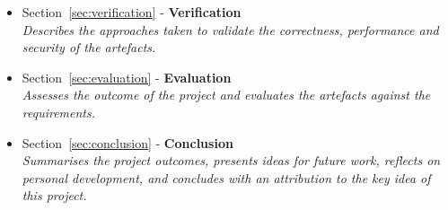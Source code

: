 \begin{itemize}
	\item Section~\ref{sec:verification} - \textbf{Verification} \\ \textit{Describes the approaches taken to validate the correctness, performance and security of the artefacts.}
	\item Section~\ref{sec:evaluation} - \textbf{Evaluation} \\ \textit{Assesses the outcome of the project and evaluates the artefacts against the requirements.}
	\item Section~\ref{sec:conclusion} - \textbf{Conclusion} \\ \textit{Summarises the project outcomes, presents ideas for future work, reflects on personal development, and concludes with an attribution to the key idea of this project.}
\end{itemize}
